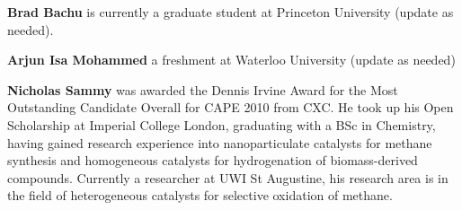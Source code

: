 \textbf{Brad Bachu} is currently a graduate student at Princeton
University (update as needed).

\vspace{5pt}

\noindent\textbf{Arjun Isa Mohammed} a freshment at Waterloo University
(update as needed)

\vspace{5pt}

\noindent\textbf{Nicholas Sammy} was awarded the Dennis Irvine Award for the Most Outstanding Candidate Overall for CAPE 2010 from CXC. He took up his Open Scholarship at Imperial College London, graduating with a BSc in Chemistry, having gained research experience into nanoparticulate catalysts for methane synthesis and homogeneous catalysts for hydrogenation of biomass-derived compounds. Currently a researcher at UWI St Augustine, his research area is in the field of heterogeneous catalysts for selective oxidation of methane.

\vspace{5pt}